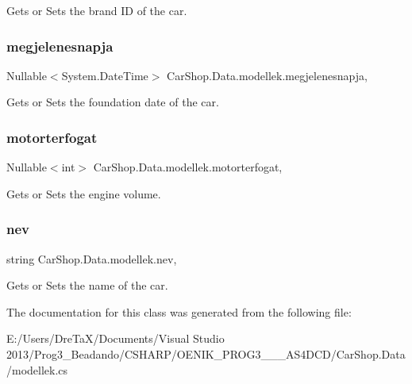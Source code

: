 Gets or Sets the brand ID of the car. 

\mbox{\label{class_car_shop_1_1_data_1_1modellek_a5cb4acf1238cc03a3658e56410d2eafb}} 
\subsubsection{\texorpdfstring{megjelenesnapja}{megjelenesnapja}}
{\footnotesize\ttfamily Nullable$<$System.\+Date\+Time$>$ Car\+Shop.\+Data.\+modellek.\+megjelenesnapja\hspace{0.3cm}{\ttfamily [get]}, {\ttfamily [set]}}



Gets or Sets the foundation date of the car. 

\mbox{\label{class_car_shop_1_1_data_1_1modellek_ade5249b6dd8597bd01c93ec16da479a3}} 
\subsubsection{\texorpdfstring{motorterfogat}{motorterfogat}}
{\footnotesize\ttfamily Nullable$<$int$>$ Car\+Shop.\+Data.\+modellek.\+motorterfogat\hspace{0.3cm}{\ttfamily [get]}, {\ttfamily [set]}}



Gets or Sets the engine volume. 

\mbox{\label{class_car_shop_1_1_data_1_1modellek_aa42b056978064ec5f4cf78c04561143d}} 
\subsubsection{\texorpdfstring{nev}{nev}}
{\footnotesize\ttfamily string Car\+Shop.\+Data.\+modellek.\+nev\hspace{0.3cm}{\ttfamily [get]}, {\ttfamily [set]}}



Gets or Sets the name of the car. 



The documentation for this class was generated from the following file\+:\begin{DoxyCompactItemize}
\item 
E\+:/\+Users/\+Dre\+Ta\+X/\+Documents/\+Visual Studio 2013/\+Prog3\+\_\+\+Beadando/\+C\+S\+H\+A\+R\+P/\+O\+E\+N\+I\+K\+\_\+\+P\+R\+O\+G3\+\_\+\_\+\_\+\+A\+S4\+D\+C\+D/\+Car\+Shop.\+Data/modellek.\+cs\end{DoxyCompactItemize}
